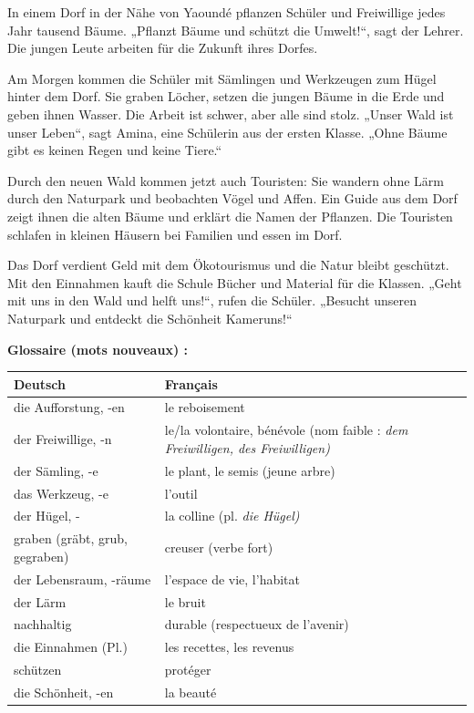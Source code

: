 \documentclass[11pt]{article}
\newcounter{popsec}
\newcounter{popsub}
\newcommand{\courssub}[1]{%
  \stepcounter{popsub}%
  \par\vspace{9pt}\noindent{\popxbold\fontsize{11.5}{13}\selectfont\color{popink}{\color{poporange}\thepopsec.\thepopsub}\hspace{6pt}#1}\par\nopagebreak\vspace{4pt}
}
\newcommand{\all}[1]{\ifmmode\text{\textit{#1}}\else\begingroup\selectlanguage{ngerman}\itshape #1\endgroup\fi}
\begin{document}
\courssub{Lecture globale du texte}

\begin{textebox}
In einem Dorf in der Nähe von Yaoundé pflanzen Schüler und Freiwillige jedes Jahr tausend Bäume. „Pflanzt Bäume und schützt die Umwelt!“, sagt der Lehrer. Die jungen Leute arbeiten für die Zukunft ihres Dorfes.

Am Morgen kommen die Schüler mit Sämlingen und Werkzeugen zum Hügel hinter dem Dorf. Sie graben Löcher, setzen die jungen Bäume in die Erde und geben ihnen Wasser. Die Arbeit ist schwer, aber alle sind stolz. „Unser Wald ist unser Leben“, sagt Amina, eine Schülerin aus der ersten Klasse. „Ohne Bäume gibt es keinen Regen und keine Tiere.“

Durch den neuen Wald kommen jetzt auch Touristen: Sie wandern ohne Lärm durch den Naturpark und beobachten Vögel und Affen. Ein Guide aus dem Dorf zeigt ihnen die alten Bäume und erklärt die Namen der Pflanzen. Die Touristen schlafen in kleinen Häusern bei Familien und essen im Dorf.

Das Dorf verdient Geld mit dem Ökotourismus und die Natur bleibt geschützt. Mit den Einnahmen kauft die Schule Bücher und Material für die Klassen. „Geht mit uns in den Wald und helft uns!“, rufen die Schüler. „Besucht unseren Naturpark und entdeckt die Schönheit Kameruns!“
\end{textebox}

\textbf{Glossaire (mots nouveaux) :}

\begin{center}
\begin{tabularx}{\linewidth}{|l|X|}
\hline
\rowcolor{popblueL} \textbf{Deutsch} & \textbf{Français} \\
\hline
die Aufforstung, -en & le reboisement \\
\hline
der Freiwillige, -n & le/la volontaire, bénévole (nom faible : \all{dem Freiwilligen}, \all{des Freiwilligen}) \\
\hline
der Sämling, -e & le plant, le semis (jeune arbre) \\
\hline
das Werkzeug, -e & l'outil \\
\hline
der Hügel, - & la colline (pl. \all{die Hügel}) \\
\hline
graben (gräbt, grub, gegraben) & creuser (verbe fort) \\
\hline
der Lebensraum, -räume & l'espace de vie, l'habitat \\
\hline
der Lärm & le bruit \\
\hline
nachhaltig & durable (respectueux de l'avenir) \\
\hline
die Einnahmen (Pl.) & les recettes, les revenus \\
\hline
schützen & protéger \\
\hline
die Schönheit, -en & la beauté \\
\hline
\end{tabularx}
\end{center}
\end{document}

